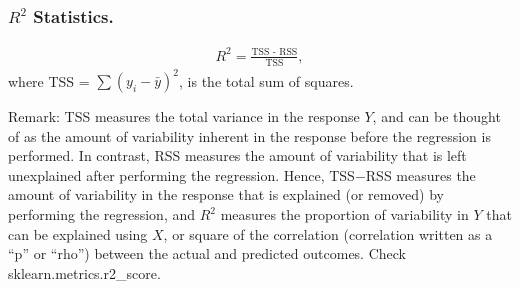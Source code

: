 \subsubsection{$R^2$ Statistics.}
\begin{align}
R^2 = \frac{\text{TSS - RSS}}{\text{TSS}},
\end{align}
where TSS = $\sum(y_i-\bar{y})^2$, is the total sum of squares.
\begin{tbox}
Remark: TSS measures the total variance in the response $Y$, and can be thought of as the amount of variability inherent in the response before the regression is performed. In contrast, RSS measures the amount of variability that is left unexplained after performing the regression. Hence, TSS$-$RSS measures the amount of variability in the response that is explained (or removed) by performing the regression, and $R^2$ measures the proportion
of variability in $Y$ that can be explained using $X$, or square of the correlation (correlation written as a “p” or “rho”) between the actual and predicted outcomes. 
Check sklearn.metrics.r2\_score.
\end{tbox}
